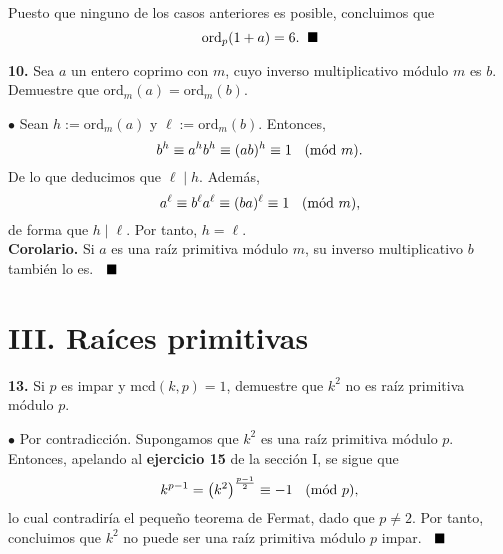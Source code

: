 \documentclass{article}
\newcommand{\Mod}[1]{\ \hspace{0.2cm} (\mathrm{m\acute{o}d}\ #1)}
\begin{document}
Puesto que ninguno de los casos anteriores es posible, concluimos que $$\text{ord}_{p}(1 + a) = 6. \hspace{0.2cm} \blacksquare$$

\vspace{7mm}

\begin{mybox}
	\textbf{10. } Sea $a$ un entero coprimo con $m$, cuyo inverso multiplicativo módulo $m$ es $b$. Demuestre que $ \text{ord}_{m}(a) = \text{ord}_{m}(b)$.
\end{mybox}	

$\bullet$ Sean $h := \text{ord}_{m}(a)$ y $\ell := \text{ord}_{m}(b).$  Entonces, 
$$ b^h \equiv a^h b^h \equiv (ab)^h \equiv 1 \Mod{m} .$$
De lo que deducimos que $\ell \mid h$. Además,
$$ a^\ell \equiv b^\ell a^\ell \equiv (ba)^\ell \equiv 1 \Mod{m} ,$$
de forma que $h \mid \ell$. Por tanto, $h = \ell$. \\

\textbf{Corolario. } Si $a$ es una raíz primitiva módulo $m$, su inverso multiplicativo $b$ también lo es. $ \hspace{0.2cm} \blacksquare$

\newpage 

\section*{ III. Raíces primitivas}

\vspace{7mm}

\begin{mybox}
	\textbf{13. } Si $p$ es impar y $\text{mcd}(k, p) = 1$, demuestre que $k^2$ no es raíz primitiva módulo $p$.
\end{mybox}	

$\bullet $ Por contradicción. Supongamos que $k^2$ es una raíz primitiva módulo $p$. Entonces, apelando al \textbf{ejercicio 15} de la sección I, se sigue que  
$$ k^{p-1} = \left( k^2 \right)^{\frac{p-1}{2}} \equiv -1 \Mod{p}, $$
lo cual contradiría el pequeño teorema de Fermat, dado que $p \neq 2$. Por tanto, concluimos que $k^2$ no puede ser una raíz primitiva módulo $p$ impar. $\hspace{0.2cm}\blacksquare$

\vspace{7mm}
\end{document}
